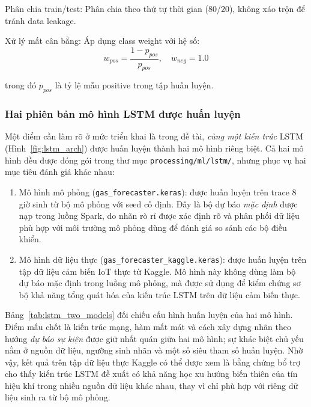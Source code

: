 Phân chia train/test: Phân chia theo thứ tự thời gian (80/20), không xáo trộn để tránh data leakage.

Xử lý mất cân bằng: Áp dụng class weight với hệ số:
\[w_{pos} = \frac{1 - p_{pos}}{p_{pos}}, \quad w_{neg} = 1.0\]

trong đó $p_{pos}$ là tỷ lệ mẫu positive trong tập huấn luyện.

\subsubsection*{Hai phiên bản mô hình LSTM được huấn luyện}
\label{sssec:lstm_two_models}

Một điểm cần làm rõ ở mức triển khai là trong đề tài, \emph{cùng một kiến trúc} LSTM (Hình~\ref{fig:lstm_arch}) được huấn luyện thành hai mô hình riêng biệt. Cả hai mô hình đều được đóng gói trong thư mục \texttt{processing/ml/lstm/}, nhưng phục vụ hai mục tiêu đánh giá khác nhau:

\begin{enumerate}
  \item Mô hình mô phỏng (\texttt{gas\_forecaster.keras}): được huấn luyện trên trace 8 giờ sinh từ bộ mô phỏng với seed cố định. Đây là bộ dự báo \emph{mặc định} được nạp trong luồng Spark, do nhãn rò rỉ được xác định rõ và phân phối dữ liệu phù hợp với môi trường mô phỏng dùng để đánh giá so sánh các bộ điều khiển.

  \item Mô hình dữ liệu thực (\texttt{gas\_forecaster\_kaggle.keras}): được huấn luyện trên tập dữ liệu cảm biến IoT thực từ Kaggle. Mô hình này không dùng làm bộ dự báo mặc định trong luồng mô phỏng, mà được sử dụng để kiểm chứng sơ bộ khả năng tổng quát hóa của kiến trúc LSTM trên dữ liệu cảm biến thực.
\end{enumerate}

Bảng~\ref{tab:lstm_two_models} đối chiếu cấu hình huấn luyện của hai mô hình. Điểm mấu chốt là kiến trúc mạng, hàm mất mát và cách xây dựng nhãn theo hướng \emph{dự báo sự kiện} được giữ nhất quán giữa hai mô hình; sự khác biệt chủ yếu nằm ở nguồn dữ liệu, ngưỡng sinh nhãn và một số siêu tham số huấn luyện. Nhờ vậy, kết quả trên tập dữ liệu thực Kaggle có thể được xem là bằng chứng bổ trợ cho thấy kiến trúc LSTM đề xuất có khả năng học xu hướng biến thiên của tín hiệu khí trong nhiều nguồn dữ liệu khác nhau, thay vì chỉ phù hợp với riêng dữ liệu sinh ra từ bộ mô phỏng.

\begingroup
\small
\renewcommand{\arraystretch}{1.25}
\setlength{\tabcolsep}{4pt}

